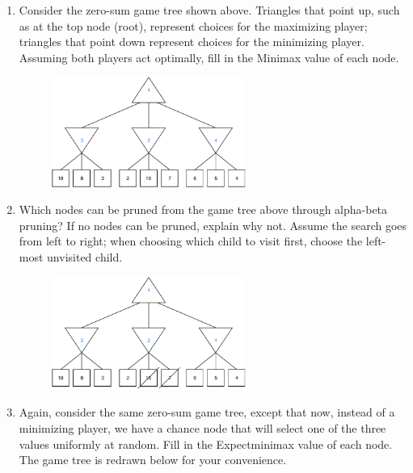 \documentclass[11pt, a4paper]{article}
\begin{document}
\begin{enumerate}
    \item Consider the zero-sum game tree shown above. Triangles that point up, such as at the top node (root), represent choices for the maximizing player; triangles that point down represent choices for the minimizing player. Assuming both players act optimally, fill in the Minimax value of each node.

    \begin{solution}
        \begin{figure}[H]
            \centering
            \includegraphics[width=0.6\textwidth]{figures/e2_minimax_1.pdf}
        \end{figure}
    \end{solution}

    \item Which nodes can be pruned from the game tree above through alpha-beta pruning? If no nodes can be pruned, explain why not. Assume the search goes from left to right; when choosing which child to visit first, choose the left-most unvisited child.

    \begin{solution}
        \begin{figure}[H]
            \centering
            \includegraphics[width=0.6\textwidth]{figures/e2_minimax_2.pdf}
        \end{figure}
    \end{solution}

    \item  Again, consider the same zero-sum game tree, except that now, instead of a minimizing player, we have a chance node that will select one of the three values uniformly at random. Fill in the Expectminimax value of each node. The game tree is redrawn below for your convenience.


\end{enumerate}
\end{document}
